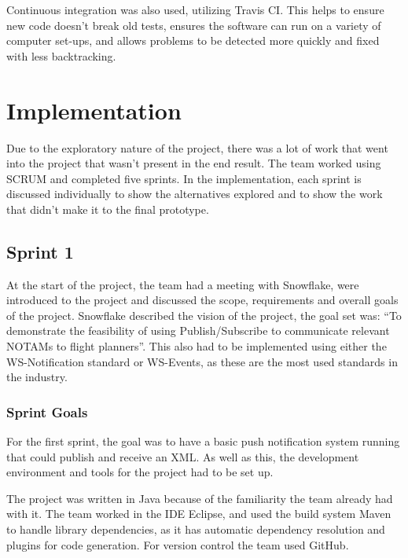 \documentclass[a4paper, 12pt, twoside]{article}
\begin{document}
Continuous integration was also used, utilizing Travis CI. This helps to ensure new code doesn't break old tests, ensures the software can run on a variety of computer set-ups, and allows problems to be detected more quickly and fixed with less backtracking.


\newpage

\section{Implementation}
\label{sec:implementation}

Due to the exploratory nature of the project, there was a lot of work that went into the project that wasn't present in the end result. The team worked using SCRUM and completed five sprints. In the implementation, each sprint is discussed individually to show the alternatives explored and to show the work that didn't make it to the final prototype.

\subsection{Sprint 1}
\label{sec:impl_sprint_1}

At the start of the project, the team had a meeting with Snowflake, were introduced to the project and discussed the scope, requirements and overall goals of the project. Snowflake described the vision of the project, the goal set was: ``To demonstrate the feasibility of using Publish/Subscribe to communicate relevant NOTAMs to flight planners''. This also had to be implemented using either the WS-Notification standard or WS-Events, as these are the most used standards in the industry.

\subsubsection{Sprint Goals}

For the first sprint, the goal was to have a basic push notification system running that could publish and receive an XML. As well as this, the development environment and tools for the project had to be set up.

The project was written in Java because of the familiarity the team already had with it. The team worked in the IDE Eclipse, and used the build system Maven to handle library dependencies, as it has automatic dependency resolution and plugins for code generation. For version control the team used GitHub.
\end{document}
